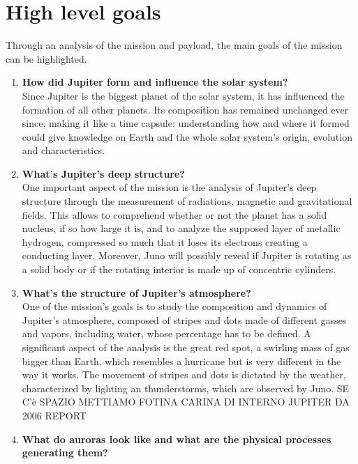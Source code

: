 \section{High level goals}
\label{sec:goals}

Through an analysis of the mission and payload, the main goals of the mission can be highlighted. 

\begin{enumerate}
    \item \textbf{How did Jupiter form and influence the solar system? }\\ %
    Since Jupiter is the biggest planet of the solar system, it has influenced the formation of all other planets. Its composition has remained unchanged ever since, making it like a time capsule: understanding how and where it formed could give knowledge on Earth and the whole solar system’s origin, evolution and characteristics. 
    \item \textbf{What's Jupiter's deep structure?}\\
    One important aspect of the mission is the analysis of Jupiter's deep structure through the measurement of radiations, magnetic and gravitational fields. This allows to comprehend whether or not the planet has a solid nucleus, if so how large it is, and to analyze the supposed layer of metallic hydrogen, compressed so much that it loses its electrons creating a conducting layer.  Moreover, Juno will possibly reveal if Jupiter is rotating as a solid body or if the rotating interior is made up of concentric cylinders. %
    \item \textbf{What's the structure of Jupiter's atmosphere?}\\ %
    One of the mission's goals is to study the composition and dynamics of Jupiter's atmosphere, composed of stripes and dots made of different gasses and vapors, including water, whose percentage has to be defined. A significant aspect of the analysis is the great red spot, a swirling mass of gas bigger than Earth, which resembles a hurricane but is very different in the way it works. The movement of stripes and dots is dictated by the weather, characterized by lighting an thunderstorms, which are observed by Juno. SE C'è SPAZIO METTIAMO FOTINA CARINA DI INTERNO JUPITER DA 2006 REPORT
    \item \textbf{What do auroras look like and what are the physical processes generating them?}\\ %

\end{enumerate}
